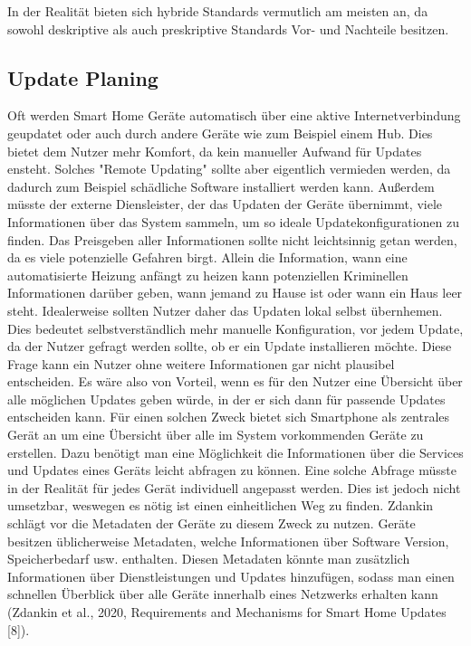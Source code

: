 In der Realität bieten sich hybride Standards vermutlich am meisten an, da sowohl deskriptive als auch preskriptive Standards Vor- und
Nachteile besitzen.   


\subsection{Update Planing}
Oft werden Smart Home Geräte automatisch über eine aktive Internetverbindung geupdatet oder auch durch andere
Geräte wie zum Beispiel einem Hub. Dies bietet dem Nutzer mehr Komfort, da kein manueller Aufwand für Updates ensteht.
Solches "Remote Updating" sollte aber eigentlich vermieden werden, da dadurch zum Beispiel schädliche Software installiert werden
kann. Außerdem müsste der externe Diensleister, der das Updaten der Geräte übernimmt, viele Informationen über das System sammeln,
um so ideale Updatekonfigurationen zu finden. Das Preisgeben aller Informationen sollte nicht leichtsinnig getan werden, da es viele
potenzielle Gefahren birgt. Allein die Information, wann eine automatisierte Heizung anfängt zu heizen kann potenziellen Kriminellen Informationen
darüber geben, wann jemand zu Hause ist oder wann ein Haus leer steht. 
Idealerweise sollten Nutzer daher das Updaten lokal selbst übernhemen. Dies bedeutet selbstverständlich mehr manuelle Konfiguration,
vor jedem Update, da der Nutzer gefragt werden sollte, ob er ein Update installieren möchte. Diese Frage kann ein Nutzer ohne weitere Informationen
gar nicht plausibel entscheiden. Es wäre also von Vorteil, wenn es für den Nutzer
eine Übersicht über alle möglichen Updates geben würde, in der er sich dann für passende Updates entscheiden kann. 
Für einen solchen Zweck bietet sich Smartphone als zentrales Gerät an um eine Übersicht über alle im 
System vorkommenden Geräte zu erstellen.
Dazu benötigt man eine Möglichkeit die Informationen über die Services und Updates eines Geräts leicht abfragen zu können.
Eine solche Abfrage müsste in der Realität für jedes Gerät individuell angepasst werden. Dies ist jedoch nicht umsetzbar,
weswegen es nötig ist einen einheitlichen Weg zu finden.
Zdankin schlägt vor die Metadaten der Geräte zu diesem Zweck zu nutzen. Geräte besitzen üblicherweise Metadaten, welche Informationen über 
Software Version, Speicherbedarf usw. enthalten. Diesen Metadaten könnte man zusätzlich Informationen über Dienstleistungen und Updates 
hinzufügen, sodass man einen schnellen Überblick über alle Geräte innerhalb eines Netzwerks erhalten kann
(Zdankin et al., 2020, Requirements and Mechanisms for Smart Home Updates [8]). 

